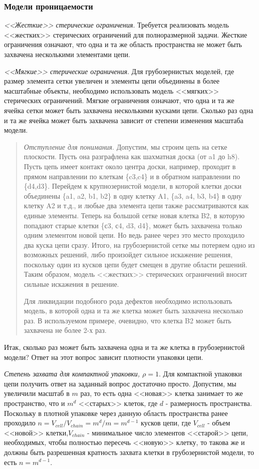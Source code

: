 \documentclass[tikz,a4paper]{scrartcl} %
\begin{document}
 
\subsubsection*{Модели проницаемости}
\textit{<<Жесткие>> стерические ограничения}. Требуется реализовать модель <<жестких>> стерических ограничений для полноразмерной задачи. Жесткие ограничения означают, что одна и та же область пространства не может быть захвачена несколькими элементами цепи.

\textit{<<Мягкие>> стерические ограничения}. Для грубозернистых моделей, где размер элемента сетки увеличен и элементы цепи объединены в более масштабные объекты, необходимо использовать модель <<мягких>> стерических ограничений. Мягкие ограничения означают, что одна и та же ячейка сетки может быть захвачена несколькими кусками цепи. Сколько раз одна и та же ячейка может быть захвачена зависит от степени изменения масштаба модели.

\begin{quote} \textit{Отступление для понимания}. 
Допустим, мы строим цепь на сетке плоскости. Пусть она разграфлена как шахматная доска (от a1 до h8). Пусть цепь имеет контакт около центра доски, например, проходит в прямом направлении по клеткам \{c3,c4\} и в обратном направлении по \{d4,d3\}. Перейдем к крупнозернистой модели, в которой клетки доски объединены \{a1, a2, b1, b2\} в одну клетку A1, \{a3, a4, b3, b4\} в одну клетку A2 и т.д., и любые два элемента цепи также рассматриваются как единые элементы. Теперь на большой сетке новая клетка B2, в которую попадают старые клетки \{с3, с4, d3, d4\}, может быть захвачена только одним элементом новой цепи. Но ведь ранее через это место проходило два куска цепи сразу. Итого, на грубозернистой сетке мы потеряем одно из возможных решений, либо произойдет сильное искажение решения, поскольку один из кусков цепи будет смещен в другие области решений. Таким образом, модель <<жестких>> стерических ограничений вносит сильные искажения в решение. 

Для ликвидации подобного рода дефектов необходимо использовать модель, в которой одна и та же клетка может быть захвачена несколько раз. В используемом примере, очевидно, что клетка B2 может быть захвачена не более 2-х раз.
\end{quote}

Итак, сколько раз может быть захвачена одна и та же клетка в грубозернистой модели?  Ответ на этот вопрос зависит плотности упаковки цепи. 

\textit{Степень захвата для компактной упаковки, $\rho = 1$}. Для компактной упаковки цепи получить ответ на заданный вопрос достаточно просто. Допустим, мы увеличили масштаб в $m$ раз, то есть одна <<новая>> клетка занимает то же пространство, что и $m^d$ <<старых>> клеток, где $d$ - размерность пространства. Поскольку в плотной упаковке через данную область пространства ранее проходило $n = V_{cell}/V_{chain} = m^d/m = m^{d-1}$ кусков цепи, где $V_{cell}$ - объем <<новой>> клетки,$V_{chain}$ - минимальное число элементов <<старой>> цепи, необходимых, чтобы полностью пересечь <<новую>> клетку, то такова же и должны быть разрешенная кратность захвата клетки в грубозернистой модели, то есть $n = m^{d-1}$.
\end{document}
